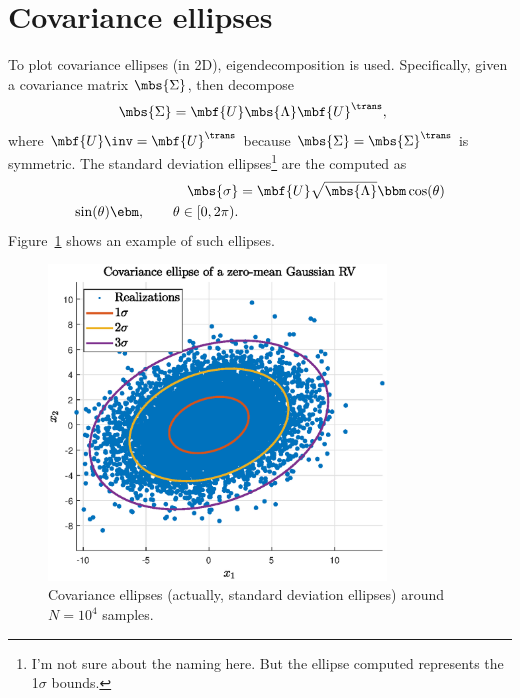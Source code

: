 \section{Covariance ellipses}
To plot covariance ellipses (in 2D), eigendecomposition is used. Specifically, given a covariance matrix $\mbs{\Sigma}$, then decompose 
\begin{align}
    \mbs{\Sigma} &= \mbf{U}\mbs{\Lambda}\mbf{U}^{\trans},
\end{align}
where $\mbf{U}\inv=\mbf{U}^{\trans}$ because $\mbs{\Sigma}=\mbs{\Sigma}^{\trans}$ is symmetric. The standard deviation ellipses\footnote{I'm not sure about the naming here. But the ellipse computed represents the 1$\sigma$ bounds.} are the computed as
\begin{align}
    \mbs{\sigma} &= \mbf{U}\sqrt{\mbs{\Lambda}}\bbm \cos(\theta)\\\sin(\theta) \ebm, \qquad \theta\in[0,2\pi).
\end{align}
Figure~\ref{fig:Example covariance ellipses} shows an example of such ellipses. 
\begin{figure}[h]
    \centering
    \includegraphics[width=0.8\textwidth]{figs/Covariance_ellipses_example.eps}    
    \caption{Covariance ellipses (actually, standard deviation ellipses) around $N=10^{4}$ samples.}
    \label{fig:Example covariance ellipses}
\end{figure}


